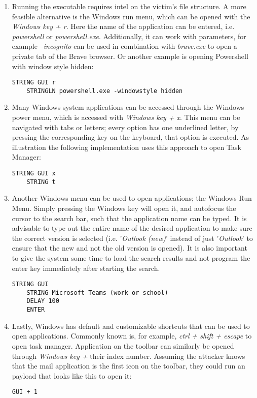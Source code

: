 \begin{enumerate}
    \item Running the executable requires intel on the victim's file structure. A more feasible alternative is the Windows run menu, which can be opened with the \textit{Windows key + r}. Here the name of the application can be entered, i.e. \textit{powershell} or \textit{powershell.exe}. Additionally, it can work with parameters, for example \textit{--incognito} can be used in combination with \textit{brave.exe} to open a private tab of the Brave browser. Or another example is opening Powershell with window style hidden:
    \begin{lstlisting}[caption={Open powershell in a hidden window with Windows Run Menu},captionpos=b]
    STRING GUI r
    STRINGLN powershell.exe -windowstyle hidden
    \end{lstlisting}
    \item Many Windows system applications can be accessed through the Windows power menu, which is accessed with \textit{Windows key + x}. This menu can be navigated with tabs or letters; every option has one underlined letter, by pressing the corresponding key on the keyboard, that option is executed. As illustration the following implementation uses this approach to open Task Manager:
    \begin{lstlisting}[caption={Open powershell with Windows Power User Menu}, captionpos=b]
    STRING GUI x
    STRING t
    \end{lstlisting}
    \item Another Windows menu can be used to open applications; the Windows Run Menu. Simply pressing the Windows key will open it, and autofocus the cursor to the search bar, such that the application name can be typed. It is advisable to type out the entire name of the desired application to make sure the correct version is selected (i.e. '\textit{Outlook (new)}' instead of just '\textit{Outlook}' to ensure that the new and not the old version is opened). It is also important to give the system some time to load the search results and not program the enter key immediately after starting the search.
    \begin{lstlisting}[caption={Open Teams through Windows Run Menu}, captionpos=b]
    STRING GUI
    STRING Microsoft Teams (work or school)
    DELAY 100
    ENTER
    \end{lstlisting}
    \item Lastly, Windows has default and customizable shortcuts that can be used to open applications. Commonly known is, for example, \textit{ctrl + shift + escape} to open task manager. Application on the toolbar can similarly be opened through \textit{Windows key +} their index number. Assuming the attacker knows that the mail application is the first icon on the toolbar, they could run an payload that looks like this to open it:
    \begin{lstlisting}[caption={Open the first item on the toolbar}, captionpos=b]
    GUI + 1
    \end{lstlisting}
\end{enumerate}

